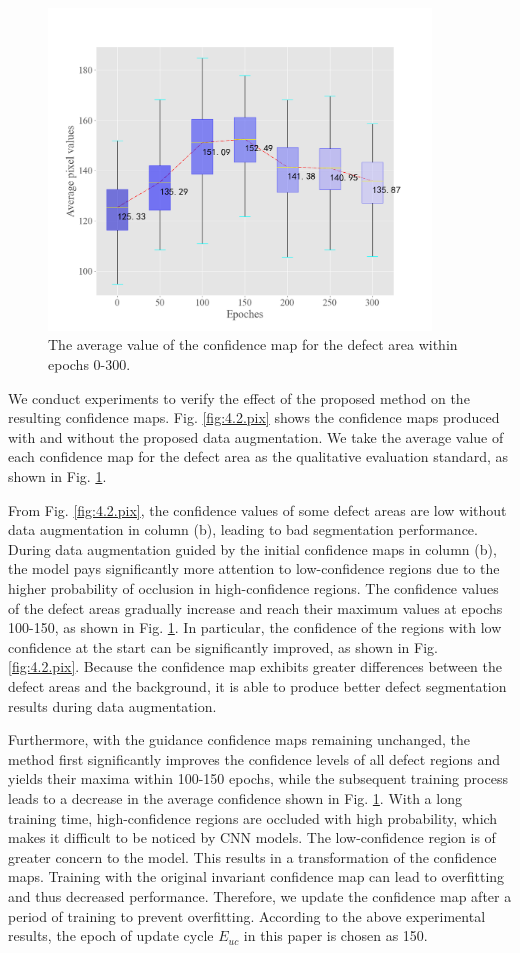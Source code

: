 \documentclass[sn-mathphys]{sn-jnl}%
\theoremstyle{thmstyleone}%
\theoremstyle{thmstyletwo}%
\theoremstyle{thmstylethree}%
\begin{document}
\begin{figure}
\centering
\includegraphics[width=4in]{fig8.png}
\caption{The average value of the confidence map for the defect area within epochs 0-300.}\label{fig:3.pix}
\end{figure}

We conduct experiments to verify the effect of the proposed method on the resulting confidence maps. Fig. \ref{fig:4.2.pix} shows the confidence maps produced with and without the proposed data augmentation. We take the average value of each confidence map for the defect area as the qualitative evaluation standard, as shown in Fig. \ref{fig:3.pix}. 

From Fig. \ref{fig:4.2.pix}, the confidence values of some defect areas are low without data augmentation in column (b), leading to bad segmentation performance. During data augmentation guided by the initial confidence maps in column (b), the model pays significantly more attention to low-confidence regions due to the higher probability of occlusion in high-confidence regions. The confidence values of the defect areas gradually increase and reach their maximum values at epochs 100-150, as shown in Fig. \ref{fig:3.pix}. In particular, the confidence of the regions with low confidence at the start can be significantly improved, as shown in Fig. \ref{fig:4.2.pix}. Because the confidence map exhibits greater differences between the defect areas and the background, it is able to produce better defect segmentation results during data augmentation.

Furthermore, with the guidance confidence maps remaining unchanged, the method first significantly improves the confidence levels of all defect regions and yields their maxima within 100-150 epochs, while the subsequent training process leads to a decrease in the average confidence shown in Fig. \ref{fig:3.pix}.  With a long training time, high-confidence regions are occluded with high probability, which makes it difficult to be noticed by CNN models. The low-confidence region is of greater concern to the model. This results in a transformation of the confidence maps. Training with the original invariant confidence map can lead to overfitting and thus decreased performance. Therefore, we update the confidence map after a period of training to prevent overfitting. According to the above experimental results, the epoch of update cycle $E_{uc}$ in this paper is chosen as 150.
\end{document}
